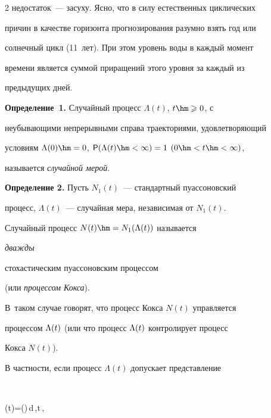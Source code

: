 \begin{multicols}{2}
недостаток~--- засуху. Ясно, что в силу естественных циклических


причин в качестве горизонта прогнозирования разумно взять год или


солнечный цикл (11~лет). При этом уровень воды в каждый момент


времени является суммой приращений этого уровня за каждый из


предыдущих дней.





\medskip





\noindent


\textbf{Определение~1.} Случайный процесс $\Lambda(t)$, $t\hm\geqslant 0$, с


неубывающими непрерывными справа траекториями, удовлетворяющий


условиям $\Lambda(0)\hm=0$, ${\sf P}(\Lambda(t)\hm<\infty)=1$ $(0\hm<t\hm<\infty)$,


называется {\it случайной мерой}.





\smallskip





\noindent


\textbf{Определение 2.} Пусть $N_1(t)$~--- стандартный пуассоновский


процесс, $\Lambda(t)$~--- случайная мера, независимая от $N_1(t)$.


Случайный процесс $N(t)\hm=N_1(\Lambda(t))$ называется {\it дважды


стохастическим пуассоновским процессом} (или {\it процессом Кокса}).


В~таком случае говорят, что процесс Кокса $N(t)$ управляется


процессом $\Lambda(t)$ (или что процесс $\Lambda(t)$ контролирует процесс


Кокса $N(t)$).





\smallskip





В частности, если процесс $\Lambda(t)$ допускает представление


$$


\Lambda(t)=\lambda(\tau)\,d\tau\,,\enskip t\,,



\end{multicols}
